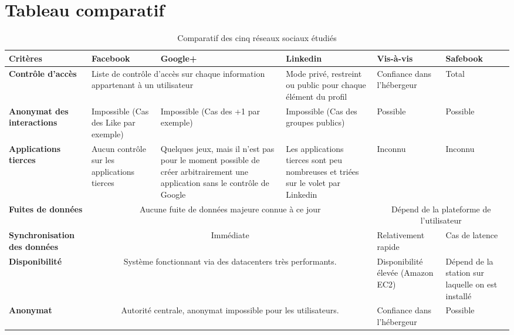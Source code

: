 \section{Tableau comparatif}

\vspace{-1.30cm}

\begin{sidewaystable}[H]
	\begin{tabular}{|p{2.7cm}|p{3.2cm}|p{3.6cm}|p{3.4cm}|p{2.9cm}|p{3.0cm}|}
\hline
\textbf{Critères}
& \bf Facebook
& \bf Google+
& \bf Linkedin
& \bf Vis-à-vis
& \bf Safebook
\\ \hline

\bf Contrôle d'accès
& \multicolumn{2}{p{6.9cm}|}{\centering Liste de contrôle d'accès sur chaque information appartenant à un utilisateur}
& Mode privé, restreint ou public pour chaque élément du profil
& Confiance dans l'hébergeur
& Total
\\ \hline

\bf Anonymat des interactions
& Impossible (Cas des Like par exemple)
& Impossible (Cas des +1 par exemple)
& Impossible (Cas des groupes publics)
& Possible
& Possible
\\ \hline

\bf Applications tierces
& Aucun contrôle sur les applications tierces
& Quelques jeux, mais il n'est pas pour le moment possible de créer arbitrairement une application sans le contrôle de Google
& Les applications tierces sont peu nombreuses et triées sur le volet par Linkedin
& Inconnu
& Inconnu
\\ \hline

\bf Fuites de données
& \multicolumn{3}{c|}{Aucune fuite de données majeure connue à ce jour}
& \multicolumn{2}{c|}{Dépend de la plateforme de l'utilisateur}
\\ \hline

\bf Synchronisation des données
& \multicolumn{3}{c|}{Immédiate}
& Relativement rapide
& Cas de latence
\\ \hline

\bf Disponibilité
&\multicolumn{3}{c|}{Système fonctionnant via des datacenters très performants.}
& Disponibilité élevée (Amazon EC2)
& Dépend de la station sur laquelle on est installé
\\ \hline

\bf Anonymat
&\multicolumn{3}{c|}{Autorité centrale, anonymat impossible pour les utilisateurs.}
&Confiance dans l'hébergeur
& Possible
\\ \hline

\end{tabular}
\caption{Comparatif des cinq réseaux sociaux étudiés}
\label{tab:comparatif}
\end{sidewaystable}
